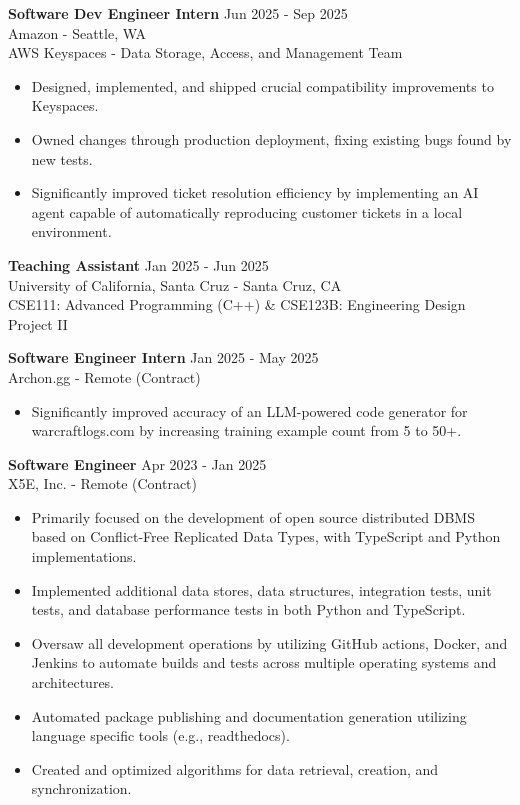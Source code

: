 \documentclass[a4paper,10pt]{article}
\begin{document}
\begin{flushleft}
  \textbf{Software Dev Engineer Intern} \hfill Jun 2025 - Sep 2025 \\
  Amazon - Seattle, WA \\
  AWS Keyspaces - Data Storage, Access, and Management Team
  \begin{itemize}
    \item Designed, implemented, and shipped crucial compatibility improvements to Keyspaces.
    \item Owned changes through production deployment, fixing existing bugs found by new tests.
    \item Significantly improved ticket resolution efficiency by implementing an AI agent capable of automatically reproducing customer tickets in a local environment.
  \end{itemize}
\end{flushleft}

\begin{flushleft}
  \textbf{Teaching Assistant} \hfill Jan 2025 - Jun 2025 \\
  University of California, Santa Cruz - Santa Cruz, CA \\
  CSE111: Advanced Programming (C++) \& CSE123B: Engineering Design Project II
\end{flushleft}

\begin{flushleft}
  \textbf{Software Engineer Intern} \hfill Jan 2025 - May 2025 \\
  Archon.gg - Remote (Contract)
  \begin{itemize}
    \item Significantly improved accuracy of an LLM-powered code generator for warcraftlogs.com by increasing training example count from 5 to 50+.
  \end{itemize}
\end{flushleft}

\begin{flushleft}
  \textbf{Software Engineer} \hfill Apr 2023 - Jan 2025 \\
  X5E, Inc. - Remote (Contract)
  \begin{itemize}
    \item Primarily focused on the development of open source distributed DBMS based on Conflict-Free Replicated Data Types, with TypeScript and Python implementations.
    \item Implemented additional data stores, data structures, integration tests, unit tests, and database performance tests in both Python and TypeScript.
    \item Oversaw all development operations by utilizing GitHub actions, Docker, and Jenkins to automate builds and tests across multiple operating systems and architectures.
    \item Automated package publishing and documentation generation utilizing language specific tools (e.g., readthedocs).
    \item Created and optimized algorithms for data retrieval, creation, and synchronization.
  \end{itemize}
\end{flushleft}
\end{document}
